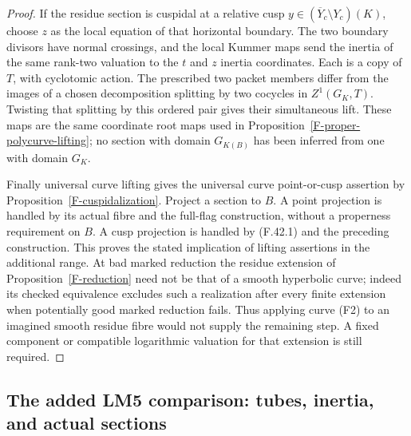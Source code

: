 \begin{proof}
If the residue section is cuspidal at a relative cusp
$y\in(\overline Y_c\setminus Y_c)(K)$, choose $z$ as the
local equation of that horizontal boundary. The two
boundary divisors have normal crossings, and the local
Kummer maps send the inertia of the same rank-two valuation
to the $t$ and $z$ inertia coordinates. Each is a copy of
$T$, with cyclotomic action. The prescribed two packet
members differ from the images of a chosen decomposition
splitting by two cocycles in $Z^1(G_K,T)$. Twisting that
splitting by this ordered pair gives their simultaneous
lift. These maps are the same coordinate root maps used
in Proposition~\ref{F-proper-polycurve-lifting}; no section
with domain $G_{K(B)}$ has been inferred from one with
domain $G_K$.

Finally universal curve lifting gives the universal curve
point-or-cusp assertion by
Proposition~\ref{F-cuspidalization}. Project a section to
$B$. A point projection is handled by its actual fibre
and the full-flag construction, without a properness
requirement on $B$. A cusp projection is handled by
(F.42.1) and the preceding construction. This proves the
stated implication of lifting assertions in the additional
range. At bad marked reduction the residue extension of
Proposition~\ref{F-reduction} need not be that of a smooth
hyperbolic curve; indeed its checked equivalence excludes
such a realization after every finite extension when
potentially good marked reduction fails. Thus applying
curve (F2) to an imagined smooth residue fibre would not
supply the remaining step. A fixed component or compatible
logarithmic valuation for that extension is still required.
\end{proof}

\subsection{The added LM5 comparison: tubes, inertia, and actual sections}

